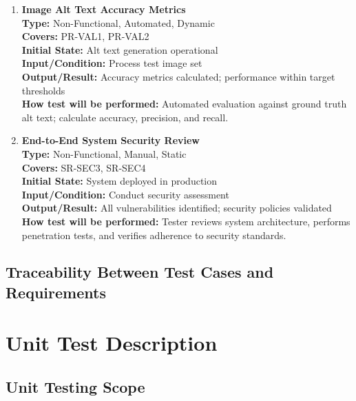 \documentclass[12pt, titlepage]{article}
\begin{document}
\begin{enumerate}[label=NFR-ST \arabic*., wide=0pt, leftmargin=*]
\item \textbf{Image Alt Text Accuracy Metrics} \\[2mm]
  \textbf{Type:} Non-Functional, Automated, Dynamic \\
  \textbf{Covers:} PR-VAL1, PR-VAL2 \\
  \textbf{Initial State:} Alt text generation operational \\
  \textbf{Input/Condition:} Process test image set \\
  \textbf{Output/Result:} Accuracy metrics calculated; performance
  within target thresholds \\[2mm]
  \textbf{How test will be performed:} Automated evaluation against
  ground truth alt text; calculate accuracy, precision, and recall.

\item \textbf{End-to-End System Security Review} \\[2mm]
  \textbf{Type:} Non-Functional, Manual, Static \\
  \textbf{Covers:} SR-SEC3, SR-SEC4 \\
  \textbf{Initial State:} System deployed in production \\
  \textbf{Input/Condition:} Conduct security assessment \\
  \textbf{Output/Result:} All vulnerabilities identified; security
  policies validated \\[2mm]
  \textbf{How test will be performed:} Tester reviews system
  architecture, performs penetration tests, and verifies adherence
  to security standards.\\

\end{enumerate}

\subsection{Traceability Between Test Cases and Requirements}


\section{Unit Test Description}
\label{Unit Test Desc}

\subsection{Unit Testing Scope}
\end{document}
